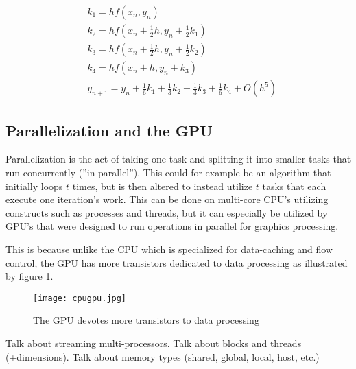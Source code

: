\begin{equation}\begin{aligned}\label{eq:rk4}
&k_1 = h f(x_n, y_n)\\
&k_2 = h f(x_n + \frac{1}{2}h, y_n + \frac{1}{2}k_1)\\
&k_3 = h f(x_n + \frac{1}{2}h, y_n + \frac{1}{2}k_2)\\
&k_4 = h f(x_n + h, y_n + k_3)\\
&y_{n+1} = y_n + \frac{1}{6}k_1 + \frac{1}{3}k_2 + \frac{1}{3}k_3 + \frac{1}{6}k_4 + O(h^5)
\end{aligned}\end{equation}

\subsection{Parallelization and the GPU}
Parallelization is the act of taking one task and splitting it into smaller tasks that run concurrently (''in parallel''). This could for example be an algorithm that initially loops $t$ times, but is then altered to instead utilize $t$ tasks that each execute one iteration's work.
This can be done on multi-core CPU's utilizing constructs such as processes and threads, but it can especially be utilized by GPU's that were designed to run operations in parallel for graphics processing.

This is because unlike the CPU which is specialized for data-caching and flow control, the GPU has more transistors dedicated to data processing as illustrated by figure \ref{cpugpu}.

\begin{figure}[h!]
\texttt{[image: cpugpu.jpg]}
\caption{The GPU devotes more transistors to data processing\cite{cuda_c_programming_guide}\label{cpugpu}}
\end{figure}



Talk about streaming multi-processors. Talk about blocks and threads (+dimensions).
Talk about memory types (shared, global, local, host, etc.)


